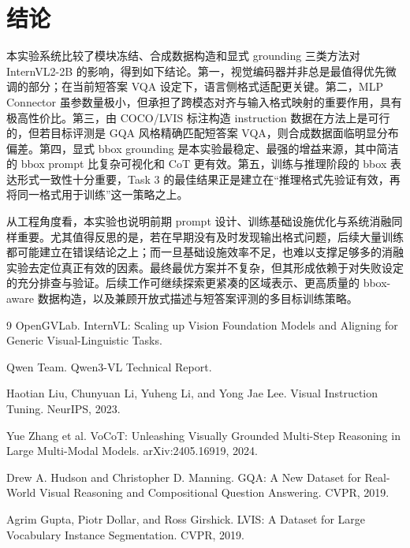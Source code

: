 \documentclass[9pt,twocolumn,a4paper]{ctexart}
\begin{document}
\section{结论}
本实验系统比较了模块冻结、合成数据构造和显式 grounding 三类方法对 InternVL2-2B 的影响，得到如下结论。第一，视觉编码器并非总是最值得优先微调的部分；在当前短答案 VQA 设定下，语言侧格式适配更关键。第二，MLP Connector 虽参数量极小，但承担了跨模态对齐与输入格式映射的重要作用，具有极高性价比。第三，由 COCO/LVIS 标注构造 instruction 数据在方法上是可行的，但若目标评测是 GQA 风格精确匹配短答案 VQA，则合成数据面临明显分布偏差。第四，显式 bbox grounding 是本实验最稳定、最强的增益来源，其中简洁的 bbox prompt 比复杂可视化和 CoT 更有效。第五，训练与推理阶段的 bbox 表达形式一致性十分重要，Task 3 的最佳结果正是建立在“推理格式先验证有效，再将同一格式用于训练”这一策略之上。

从工程角度看，本实验也说明前期 prompt 设计、训练基础设施优化与系统消融同样重要。尤其值得反思的是，若在早期没有及时发现输出格式问题，后续大量训练都可能建立在错误结论之上；而一旦基础设施效率不足，也难以支撑足够多的消融实验去定位真正有效的因素。最终最优方案并不复杂，但其形成依赖于对失败设定的充分排查与验证。后续工作可继续探索更紧凑的区域表示、更高质量的 bbox-aware 数据构造，以及兼顾开放式描述与短答案评测的多目标训练策略。

\begingroup
\footnotesize
\begin{thebibliography}{9}
OpenGVLab. InternVL: Scaling up Vision Foundation Models and Aligning for Generic Visual-Linguistic Tasks.

Qwen Team. Qwen3-VL Technical Report.

Haotian Liu, Chunyuan Li, Yuheng Li, and Yong Jae Lee. Visual Instruction Tuning. NeurIPS, 2023.

Yue Zhang et al. VoCoT: Unleashing Visually Grounded Multi-Step Reasoning in Large Multi-Modal Models. arXiv:2405.16919, 2024.

Drew A. Hudson and Christopher D. Manning. GQA: A New Dataset for Real-World Visual Reasoning and Compositional Question Answering. CVPR, 2019.

Agrim Gupta, Piotr Dollar, and Ross Girshick. LVIS: A Dataset for Large Vocabulary Instance Segmentation. CVPR, 2019.
\end{thebibliography}
\endgroup
\end{document}
